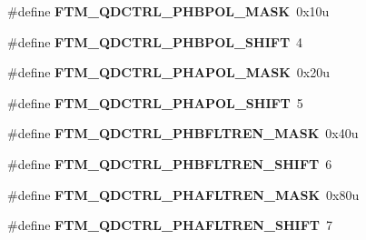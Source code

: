 \begin{DoxyCompactItemize}
\item 
\#define {\bfseries F\+T\+M\+\_\+\+Q\+D\+C\+T\+R\+L\+\_\+\+P\+H\+B\+P\+O\+L\+\_\+\+M\+A\+SK}~0x10u\hypertarget{group__FTM__Register__Masks_ga58a390751189f10795710f0726e42685}{}\label{group__FTM__Register__Masks_ga58a390751189f10795710f0726e42685}

\item 
\#define {\bfseries F\+T\+M\+\_\+\+Q\+D\+C\+T\+R\+L\+\_\+\+P\+H\+B\+P\+O\+L\+\_\+\+S\+H\+I\+FT}~4\hypertarget{group__FTM__Register__Masks_gafd01650a0aa5dc97f5a738b70654944e}{}\label{group__FTM__Register__Masks_gafd01650a0aa5dc97f5a738b70654944e}

\item 
\#define {\bfseries F\+T\+M\+\_\+\+Q\+D\+C\+T\+R\+L\+\_\+\+P\+H\+A\+P\+O\+L\+\_\+\+M\+A\+SK}~0x20u\hypertarget{group__FTM__Register__Masks_gab8076d97d00af4a3e87a542af63bf45a}{}\label{group__FTM__Register__Masks_gab8076d97d00af4a3e87a542af63bf45a}

\item 
\#define {\bfseries F\+T\+M\+\_\+\+Q\+D\+C\+T\+R\+L\+\_\+\+P\+H\+A\+P\+O\+L\+\_\+\+S\+H\+I\+FT}~5\hypertarget{group__FTM__Register__Masks_ga22621810bf1d949ef10f337e826a6649}{}\label{group__FTM__Register__Masks_ga22621810bf1d949ef10f337e826a6649}

\item 
\#define {\bfseries F\+T\+M\+\_\+\+Q\+D\+C\+T\+R\+L\+\_\+\+P\+H\+B\+F\+L\+T\+R\+E\+N\+\_\+\+M\+A\+SK}~0x40u\hypertarget{group__FTM__Register__Masks_ga5458826b9d2a62a17c2fca3c13fd45c5}{}\label{group__FTM__Register__Masks_ga5458826b9d2a62a17c2fca3c13fd45c5}

\item 
\#define {\bfseries F\+T\+M\+\_\+\+Q\+D\+C\+T\+R\+L\+\_\+\+P\+H\+B\+F\+L\+T\+R\+E\+N\+\_\+\+S\+H\+I\+FT}~6\hypertarget{group__FTM__Register__Masks_gaf6681fd1dc7277fba2da13be8c2a46e7}{}\label{group__FTM__Register__Masks_gaf6681fd1dc7277fba2da13be8c2a46e7}

\item 
\#define {\bfseries F\+T\+M\+\_\+\+Q\+D\+C\+T\+R\+L\+\_\+\+P\+H\+A\+F\+L\+T\+R\+E\+N\+\_\+\+M\+A\+SK}~0x80u\hypertarget{group__FTM__Register__Masks_ga1284593b1a9c13205dbbbf5647659049}{}\label{group__FTM__Register__Masks_ga1284593b1a9c13205dbbbf5647659049}

\item 
\#define {\bfseries F\+T\+M\+\_\+\+Q\+D\+C\+T\+R\+L\+\_\+\+P\+H\+A\+F\+L\+T\+R\+E\+N\+\_\+\+S\+H\+I\+FT}~7\hypertarget{group__FTM__Register__Masks_ga8d2e6d6756632fdfe6efced044320d48}{}\label{group__FTM__Register__Masks_ga8d2e6d6756632fdfe6efced044320d48}


\end{DoxyCompactItemize}
